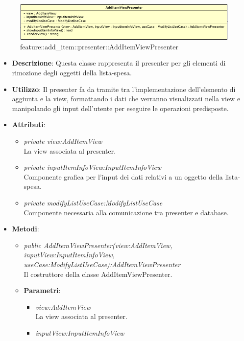\label{feature::add_item::presenter::AddItemViewPresenter}
\begin{figure}[ht]
	\centering
	\includegraphics[scale=0.5]{Sezioni/SottosezioniST/img/app/AddItemViewPresenter.png}
	\caption{feature::add\_item::presenter::AddItemViewPresenter}
\end{figure}

\begin{itemize}
\item \textbf{Descrizione}: Questa classe rappresenta il presenter per gli elementi di rimozione degli oggetti  della lista-spesa.
\item \textbf{Utilizzo}: Il presenter fa da tramite tra l'implementazione dell'elemento di aggiunta e la view, formattando i dati che verranno visualizzati nella view e manipolando gli input dell'utente per eseguire le operazioni predisposte.
\item \textbf{Attributi}: 
	\begin{itemize}
	\item \textit{private view:AddItemView}\\
	La view associata al presenter.
	\item \textit{private inputItemInfoView:InputItemInfoView}\\
	Componente grafica per l'input dei dati relativi a un oggetto della lista-spesa.
	\item \textit{private modifyListUseCase:ModifyListUseCase}\\
	Componente necessaria alla comunicazione tra presenter e database.
	\end{itemize}
\item \textbf{Metodi}:
	\begin{itemize}
	\item \textit{public AddItemViewPresenter(view:AddItemView, inputView:InputItemInfoView, useCase:ModifyListUseCase):AddItemViewPresenter}\\
	Il costruttore della classe AddItemViewPresenter.	
		\item{\textbf{Parametri}: \begin{itemize}
		\item \textit{view:AddItemView}\\
			La view associata al presenter.
		\item \textit{inputView:InputItemInfoView}\\

\end{itemize}}
\end{itemize}
\end{itemize}
